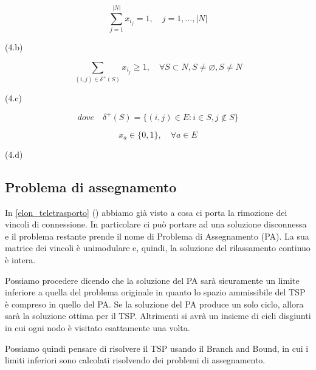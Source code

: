 \begin{minipage}[t]{0.9\textwidth}
\[
\sum_{j = 1}^{|N|} x_{i_j} = 1, \quad  j = 1, \dots, |N|
\]
\end{minipage}%
\begin{minipage}[t]{0.1\textwidth}
\vspace{0,4cm}
(4.b)
\end{minipage}

\begin{minipage}[t]{0.9\textwidth}
\[
\sum_{(i, j) \in \delta^{+}(S)}  x_{i_j} \geq 1, \quad \forall S \subset N, S \ne \varnothing, S \ne N
\]
\end{minipage}%
\begin{minipage}[t]{0.1\textwidth}
\vspace{0,2cm}
(4.c)
\end{minipage}

\[
dove \quad \delta^{+}(S) = \{ (i,j) \in E: i \in S, j \notin S \}
\]

\begin{minipage}[t]{0.9\textwidth}
\[
x_a \in \{0, 1\}, \quad \forall a \in E
\]
\end{minipage}%
\begin{minipage}[t]{0.1\textwidth}
\vspace{0,1cm}
(4.d)
\end{minipage}

\subsection{Problema di assegnamento}
In \ref{elon_teletrasporto} () abbiamo già visto a cosa ci porta la rimozione dei vincoli di connessione. In particolare ci può portare ad una soluzione disconnessa e il problema restante prende il nome di Problema di Assegnamento (PA). La sua matrice dei vincoli è unimodulare e, quindi, la soluzione del rilassamento continuo è intera.

Possiamo procedere dicendo che la soluzione del PA sarà sicuramente un limite inferiore a quella del problema originale in quanto lo spazio ammissibile del TSP è compreso in quello del PA. Se la soluzione del PA produce un solo ciclo, allora sarà la soluzione ottima per il TSP. Altrimenti si avrà un insieme di cicli disgiunti in cui ogni nodo è visitato esattamente una volta.

Possiamo quindi pensare di risolvere il TSP usando il Branch and Bound, in cui i limiti inferiori sono calcolati risolvendo dei problemi di assegnamento. 

